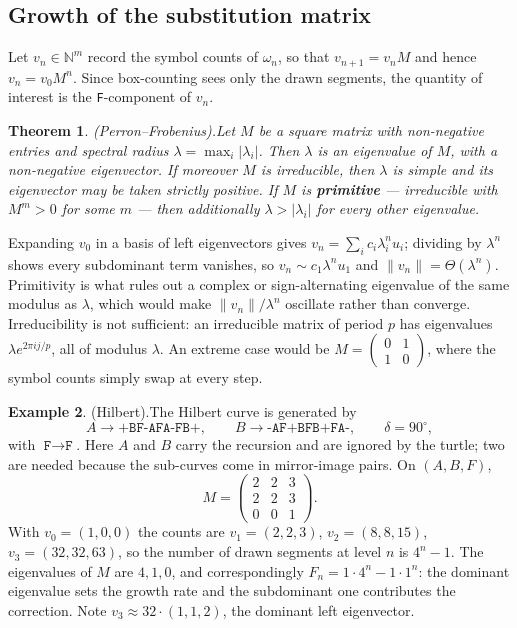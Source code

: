 \documentclass[11pt, a4paper]{article}
\theoremstyle{plain}
\newtheorem{theorem}{Theorem}[section]
\theoremstyle{definition}
\newtheorem{example}[theorem]{Example}
\theoremstyle{remark}
\newcommand{\N}{\mathbb{N}}
\begin{document}
\subsection{Growth of the substitution matrix}
Let $v_n\in\N^m$ record the symbol counts of $\omega_n$, so that $v_{n+1}=v_nM$
and hence $v_n=v_0M^n$. Since box-counting sees only the drawn segments, the
quantity of interest is the \texttt{F}-component of $v_n$.

\begin{theorem}{(Perron--Frobenius).}\label{thm:pf}
    Let $M$ be a square matrix with non-negative entries and spectral radius
    $\lambda=\max_i|\lambda_i|$. Then $\lambda$ is an eigenvalue of $M$, with a
    non-negative eigenvector. If moreover $M$ is irreducible, then $\lambda$ is
    simple and its eigenvector may be taken strictly positive. If $M$ is
    \textbf{primitive} --- irreducible with $M^m>0$ for some $m$ --- then
    additionally $\lambda>|\lambda_i|$ for every other eigenvalue.
\end{theorem}

\noindent Expanding $v_0$ in a basis of left eigenvectors gives
$v_n=\sum_i c_i\lambda_i^nu_i$; dividing by $\lambda^n$ shows every subdominant
term vanishes, so $v_n\sim c_1\lambda^nu_1$ and $\|v_n\|=\Theta(\lambda^n)$.
Primitivity is what rules out a complex or sign-alternating eigenvalue of the
same modulus as $\lambda$, which would make $\|v_n\|/\lambda^n$ oscillate
rather than converge. Irreducibility is not sufficient: an irreducible matrix of
period $p$ has eigenvalues $\lambda e^{2\pi ij/p}$, all of modulus $\lambda$.
An extreme case would be $M=\left(\begin{smallmatrix}0&1\\1&0\end{smallmatrix}\right)$,
where the symbol counts simply swap at every step.

\begin{example}{(Hilbert).}\label{ex:hilbert}
    The Hilbert curve is generated by
    \[
    A\to\texttt{+BF-AFA-FB+},\qquad B\to\texttt{-AF+BFB+FA-},\qquad
    \delta=90^\circ,
    \]
    with $\texttt{F}\to\texttt{F}$. Here $A$ and $B$ carry the recursion and are
    ignored by the turtle; two are needed because the sub-curves come in mirror-image pairs. On $(A,B,F)$,
    \[
    M=\begin{pmatrix}2&2&3\\2&2&3\\0&0&1\end{pmatrix}.
    \]
    With $v_0=(1,0,0)$ the counts are $v_1=(2,2,3)$, $v_2=(8,8,15)$,
    $v_3=(32,32,63)$, so the number of drawn segments at level $n$ is $4^n-1$.
    The eigenvalues of $M$ are $4,1,0$, and correspondingly
    $F_n=1\cdot4^n-1\cdot1^n$: the dominant eigenvalue sets the growth rate and
    the subdominant one contributes the correction. Note $v_3\approx
    32\cdot(1,1,2)$, the dominant left eigenvector.
\end{example}
\end{document}

